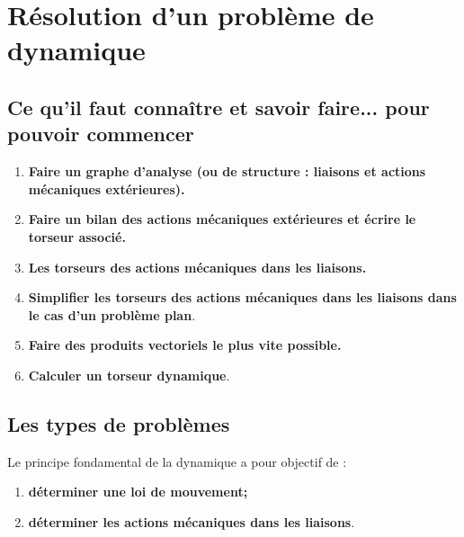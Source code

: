 %
{}
\setchapterpreamble[u]{\margintoc}

\chapter{Résolution d'un problème de dynamique}



\setcounter{section}{0}
\section{Ce qu'il faut connaître et savoir faire... pour pouvoir commencer}
\begin{enumerate}
\item \textbf{Faire un graphe d'analyse (ou de structure : liaisons et actions mécaniques extérieures).}
\item \textbf{Faire un bilan des actions mécaniques extérieures et écrire le torseur associé.}
\item \textbf{Les torseurs des actions mécaniques dans les liaisons.}
\item \textbf{Simplifier les torseurs des actions mécaniques dans les liaisons dans le cas d'un problème plan}.
\item \textbf{Faire des produits vectoriels le plus vite possible.}
\item \textbf{Calculer un torseur dynamique}.
\end{enumerate}



\section{Les types de problèmes}

Le principe fondamental de la dynamique a pour objectif de :
\begin{enumerate}
\item \textbf{déterminer une loi de mouvement;}
\item \textbf{déterminer les actions mécaniques dans les liaisons}.
\end{enumerate}

